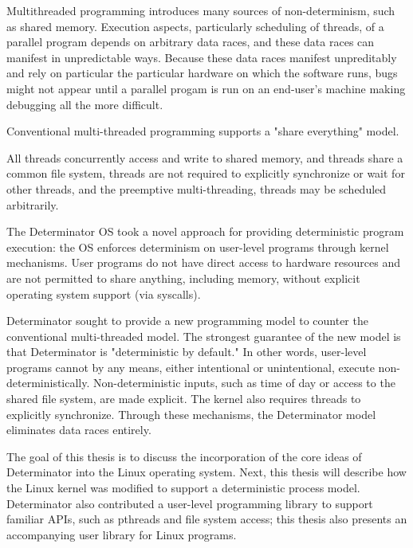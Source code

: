 Multithreaded programming introduces many sources of non-determinism, such as
shared memory. Execution aspects, particularly scheduling of threads, of a
parallel program depends on arbitrary data races, and these data races can
manifest in unpredictable ways. Because these data races manifest unpreditably
and rely on particular the particular hardware on which the software runs, bugs
might not appear until a parallel progam is run on an end-user's machine making
debugging all the more difficult.

Conventional multi-threaded programming supports a "share everything" model.

All threads concurrently access and write to shared memory, and threads share a
common file system, threads are not required to explicitly synchronize or wait
for other threads, and the preemptive multi-threading, threads may be scheduled
arbitrarily.

The Determinator OS took a novel approach for providing deterministic program
execution: the OS enforces determinism on user-level programs through kernel
mechanisms. User programs do not have direct access to hardware resources and
are not permitted to share anything, including memory, without explicit
operating system support (via syscalls).

Determinator sought to provide a new programming model to counter the
conventional multi-threaded model. The strongest guarantee of the new model
is that Determinator is "deterministic by default." In other words, user-level
programs cannot by any means, either intentional or unintentional, execute
non-deterministically. Non-deterministic inputs, such as time of day or access
to the shared file system, are made explicit. The kernel also requires threads
to explicitly synchronize. Through these mechanisms, the Determinator model
eliminates data races entirely.

The goal of this thesis is to discuss the incorporation of the core ideas of
Determinator into the Linux operating system. Next, this thesis will describe
how the Linux kernel was modified to support a deterministic process model.
Determinator also contributed a user-level programming library to support
familiar APIs, such as pthreads and file system access; this thesis also
presents an accompanying user library for Linux programs.

\fi
\endinput

